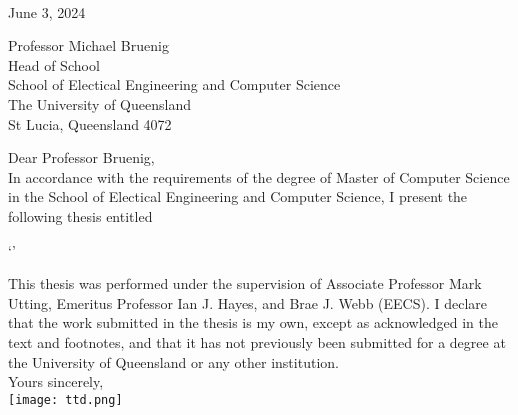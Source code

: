 \begin{flushright}
    \authortext\\
    \href{mailto:\authoremailtext}{\authoremailtext}
\end{flushright}

\vspace{2cm}
\noindent
June 3, 2024 \\\bigskip

\noindent
Professor Michael Bruenig\\
Head of School\\
School of Electical Engineering and Computer Science\\
The University of Queensland\\
St Lucia, Queensland 4072\\\bigskip

\noindent
Dear Professor Bruenig,\\

In accordance with the requirements of the degree of Master of Computer Science in the School of Electical Engineering and Computer Science, I present the following thesis entitled

\begin{center}
`\titletext'
\end{center}

This thesis was performed under the supervision of Associate Professor Mark Utting, Emeritus Professor Ian J. Hayes, and Brae J. Webb (EECS). I declare that the work submitted in the thesis is my own, except as acknowledged in the text and footnotes, and that it has not previously been submitted for a degree at the University of Queensland or any other institution.\\

\noindent
Yours sincerely,\\%
\texttt{[image: ttd.png]}\\
\noindent
\authortext

\clearpage